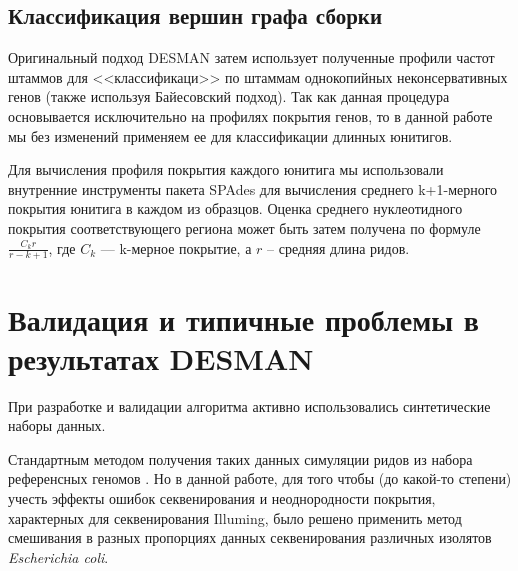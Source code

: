 \documentclass{spbau-diploma}
\begin{document}

\subsection{Классификация вершин графа сборки}

Оригинальный подход DESMAN затем использует полученные профили частот штаммов для <<классификаци>> по штаммам однокопийных неконсервативных генов (также используя Байесовский подход). Так как данная процедура основывается исключительно на профилях покрытия генов, то в данной работе мы без изменений применяем ее для классификации длинных юнитигов. 


Для вычисления профиля покрытия каждого юнитига мы использовали внутренние инструменты пакета SPAdes для вычисления среднего k+1-мерного покрытия юнитига в каждом из образцов. Оценка среднего нуклеотидного покрытия соответствующего региона может быть затем получена по формуле $\frac{C_k r}{r - k + 1}$, где $C_k$ --- k-мерное покрытие, а $r$ -- средняя длина ридов.



\section{Валидация и типичные проблемы в результатах DESMAN}

При разработке и валидации алгоритма активно использовались синтетические наборы данных. 

Стандартным методом получения таких данных симуляции ридов из набора референсных геномов \cite{DESMAN, CONCOCT}.
Но в данной работе, для того чтобы (до какой-то степени) учесть эффекты ошибок секвенирования и неоднородности покрытия, характерных для секвенирования Illuming, было решено применить метод смешивания в разных пропорциях данных секвенирования различных изолятов \textit{Escherichia coli}. 
\end{document}

